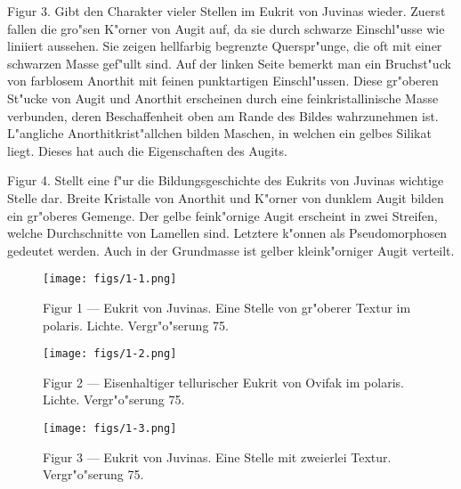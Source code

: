 \documentclass[a4paper, 11pt, oneside, polutonikogreek, german]{article}
\begin{document}
Figur 3. Gibt den Charakter vieler Stellen im Eukrit von Juvinas wieder. Zuerst fallen die gro"sen K"orner von Augit auf, da sie durch schwarze Einschl"usse wie liniiert aussehen. Sie zeigen hellfarbig begrenzte Querspr"unge, die oft mit einer schwarzen Masse gef"ullt sind. Auf der linken Seite bemerkt man ein Bruchst"uck von farblosem Anorthit mit feinen punktartigen Einschl"ussen. Diese gr"oberen St"ucke von Augit und Anorthit erscheinen durch eine feinkristallinische Masse verbunden, deren Beschaffenheit oben am Rande des Bildes wahrzunehmen ist. L"angliche Anorthitkrist"allchen bilden Maschen, in welchen ein gelbes Silikat liegt. Dieses hat auch die Eigenschaften des Augits.

Figur 4. Stellt eine f"ur die Bildungsgeschichte des Eukrits von Juvinas wichtige Stelle dar. Breite Kristalle von Anorthit und K"orner von dunklem Augit bilden ein gr"oberes Gemenge. Der gelbe feink"ornige Augit erscheint in zwei Streifen, welche Durchschnitte von Lamellen sind. Letztere k"onnen als Pseudomorphosen gedeutet werden. Auch in der Grundmasse ist gelber kleink"orniger Augit verteilt.
\clearpage

\cfoot{\thepage}
\vspace*{\fill}
\begin{figure}[H]
\centering
\texttt{[image: figs/1-1.png]}
\caption{\small Figur 1 --- Eukrit von Juvinas. Eine Stelle von gr"oberer Textur im polaris. Lichte. Vergr"o"serung 75.}
\end{figure}
\vspace*{\fill}
\clearpage

\vspace*{\fill}
\begin{figure}[H]
\centering
\texttt{[image: figs/1-2.png]}
\caption{\small Figur 2 --- Eisenhaltiger tellurischer Eukrit von Ovifak im polaris. Lichte. Vergr"o"serung 75.}
\end{figure}
\vspace*{\fill}
\clearpage

\vspace*{\fill}
\begin{figure}[H]
\centering
\texttt{[image: figs/1-3.png]}
\caption{\small Figur 3 --- Eukrit von Juvinas. Eine Stelle mit zweierlei Textur. Vergr"o"serung 75.}
\end{figure}
\vspace*{\fill}
\clearpage
\end{document}
